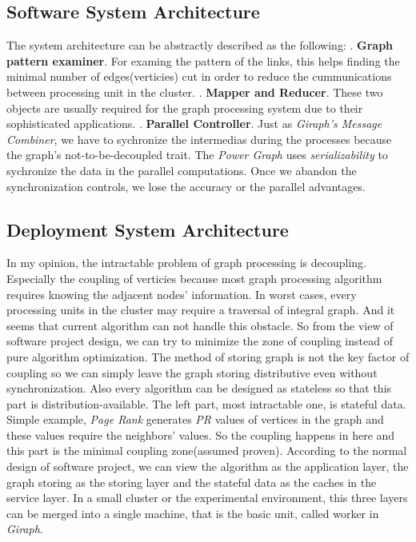 \documentclass{article}
\begin{document}
	\subsection{Software System Architecture}
	The system architecture can be abstractly described as the following:
	. \textbf{Graph pattern examiner}. For examing the pattern of the links, this helps finding the minimal number of edges(verticies) cut in order to reduce the cummunications between processing unit in the cluster.
	. \textbf{Mapper and Reducer}. These two objects are usually required for the graph processing system due to their sophisticated applications.
	. \textbf{Parallel Controller}. Just as \emph{Giraph's Message Combiner}, we have to sychronize the intermedias during the processes because the graph's not-to-be-decoupled trait. The \emph{Power Graph} uses \emph{serializability} to sychronize the data in the parallel computations. Once we abandon the synchronization controls, we lose the accuracy or the parallel advantages.

	\subsection{Deployment System Architecture}
	In my opinion, the intractable problem of graph processing is decoupling. Especially the coupling of verticies because most graph processing algorithm requires knowing the adjacent nodes' information. In worst cases, every processing units in the cluster may require a traversal of integral graph. And it seems that current algorithm can not handle this obstacle.
	\newline
	So from the view of software project design, we can try to minimize the zone of coupling instead of pure algorithm optimization. The method of storing graph is not the key factor of coupling so we can simply leave the graph storing distributive even without synchronization. Also every algorithm can be designed as stateless so that this part is distribution-available. The left part, most intractable one, is stateful data. Simple example, \emph{Page Rank} generates \emph{PR} values of vertices in the graph and these values require the neighbors' values. So the coupling happens in here and this part is the minimal coupling zone(assumed proven).
	\newline
	According to the normal design of software project, we can view the algorithm as the application layer, the graph storing as the storing layer and the stateful data as the caches in the service layer.
	\newline
	In a small cluster or the experimental environment, this three layers can be merged into a single machine, that is the basic unit, called worker in \emph{Giraph}.
\end{document}
